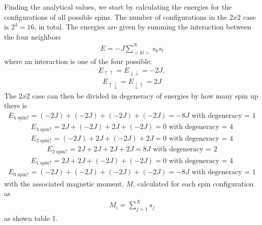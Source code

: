 \documentclass[12pt,english,a4paper]{article}
\begin{document}
Finding the analytical values, we start by calculating the energies for the configurations of all possible spins. The number of configurations in the $2x2$ case is  $2^4 = 16$, in total. The energies are given by summing the interaction between the four neighbors
\begin{align*}
    E = -J \sum_{<kl>}^N s_ks_l 
\end{align*}
where an interaction is one of the four possible:
\begin{align*}
    E_{\uparrow \uparrow} = E_{\downarrow \downarrow} = -2J, 
\end{align*}
\begin{align*}
    E_{\uparrow \downarrow} = E_{\downarrow \uparrow} = 2J
\end{align*}
The $2x2$ case can then be divided in degeneracy of energies by how many spin up there is
\begin{align*}
    E_{\text{4 spin}\uparrow} = (-2J) + (-2J) + (-2J) + (-2J) = -8J \text{ with degeneracy = 1}
\end{align*}
\begin{align*}
    E_{\text{3 spin}\uparrow} = 2J + (-2J) + 2J + (-2J) = 0 \text{ with degeneracy = 4}
\end{align*}
\begin{align*}
    E_{\text{2 spin}\uparrow} = (-2J) + 2J + (-2J) + 2J = 0 \text{ with degeneracy = 4}
\end{align*}
\begin{align*}
    E_{\text{2 spin}\uparrow} = 2J + 2J + 2J + 2J = 8J \text{ with degeneracy = 2}
\end{align*}
\begin{align*}
    E_{\text{1 spin}\uparrow} = 2J + 2J + (-2J) + (-2J) = 0 \text{ with degeneracy = 4}
\end{align*}
\begin{align*}
    E_{\text{0 spin}\uparrow} = (-2J) + (-2J) + (-2J) + (-2J) = -8J \text{ with degeneracy = 1}
\end{align*}
with the associated magnetic moment, $M$, calculated for each spin configuration as
\begin{align*}
    M_{i}=\sum_{j=1}^{N} s_{j}
\end{align*}
as shown table 1.
\end{document}
